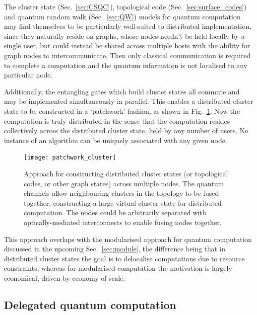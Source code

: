 The cluster state (Sec.~\ref{sec:CSQC}), topological code (Sec.~\ref{sec:surface_codes}) and quantum random walk (Sec.~\ref{sec:QW}) models for quantum computation may find themselves to be particularly well-suited to distributed implementation, since they naturally reside on graphs, whose nodes needn't be held locally by a single user, but could instead be shared across multiple hosts with the ability for graph nodes to intercommunicate. Then only classical communication is required to complete a computation and the quantum information is not localised to any particular node.

Additionally, the entangling gates which build cluster states all commute and may be implemented simultaneously in parallel. This enables a distributed cluster state to be constructed in a `patchwork' fashion, as shown in Fig.~\ref{fig:patchwork_cluster}. Now the computation is truly distributed in the sense that the computation resides collectively across the distributed cluster state, held by any number of users. No instance of an algorithm can be uniquely associated with any given node.

\begin{figure}[!htbp]
\texttt{[image: patchwork\_cluster]} 
\captionspacefig \caption{Approach for constructing distributed cluster states (or topological codes, or other graph states) across multiple nodes. The quantum channels allow neighbouring clusters in the topology to be fused together, constructing a large virtual cluster state for distributed computation. The nodes could be arbitrarily separated with optically-mediated interconnects to enable fusing nodes together.} \label{fig:patchwork_cluster}
\end{figure}

This approach overlaps with the modularised approach for quantum computation discussed in the upcoming Sec.~\ref{sec:module}, the difference being that in distributed cluster states the goal is to delocalise computations due to resource constraints, whereas for modularised computation the motivation is largely economical, driven by economy of scale.

%
%

\subsection{Delegated quantum computation} 

